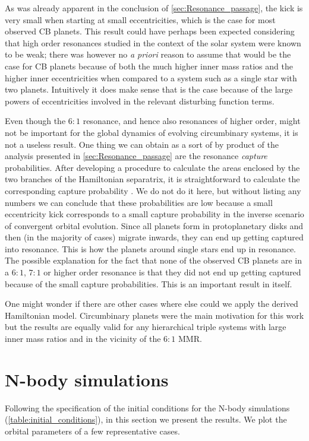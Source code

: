 \documentclass[twoside,openright,titlepage,numbers=noenddot,headinclude,%
                footinclude=true,cleardoublepage=empty,abstractoff, 
                BCOR=5mm,paper=a4,fontsize=11pt,%
                american,%
                ]{scrreprt}%
\begin{document}
As was already apparent in the conclusion of \cref{sec:Resonance_passage}, the
kick is very small when starting at small eccentricities, which is the case for
most observed CB planets. This result could have perhaps been expected
considering that high order resonances studied in the context of the solar
system were known to be weak; there was however no \emph{a priori} reason to
assume that would be the case for CB planets because of both the
much higher inner mass ratios and the higher inner eccentricities when compared
to a system such as a single star with two planets. Intuitively it does make
sense that is the case because of the large powers of eccentricities involved
in the relevant disturbing function terms.

Even though the $6:1$ resonance, and hence also resonances of higher order, 
might not be important for the global dynamics of evolving circumbinary systems,
it is not a useless result. One thing we can obtain as a sort of by product
of the analysis presented in \cref{sec:Resonance_passage} are the resonance
\emph{capture} probabilities. After developing a procedure to calculate the
areas enclosed by the two branches of the Hamiltonian separatrix, it is 
straightforward to calculate the corresponding capture probability 
\citep{murray}. We do not do it here, but without listing any numbers we can
conclude that these probabilities are low because a small eccentricity
kick corresponds to  a small capture probability in the inverse scenario
of convergent orbital evolution. Since all planets form in protoplanetary 
disks and then (in the majority of cases) migrate inwards, they can end
up getting captured into resonance. This is how the planets around single stars
end up in resonance. The possible explanation for the fact that none of the
observed CB planets are in a $6:1$, $7:1$ or higher order resonance
is that they did not end up getting captured because of the small capture
probabilities. This is an important result in itself.

One might wonder if there are other cases where else could we apply the 
derived Hamiltonian model. Circumbinary planets were the main motivation
for this work but the results are equally valid for any hierarchical triple
systems with large inner mass ratios and in the vicinity of the $6:1$ MMR.

\section{N-body simulations}
\label{sec:Comparison to the analytical model}
Following the specification of the initial conditions for the
N-body simulations (\cref{table:initial_conditions}), in this section we 
present the results. We plot the orbital parameters of a few representative
cases.
\end{document}
